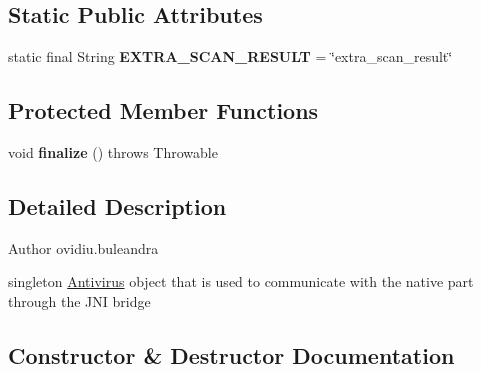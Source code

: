 \subsection*{Static Public Attributes}
\begin{DoxyCompactItemize}
\item 
\hypertarget{classcom_1_1avira_1_1antivirusimplementation_1_1_antivirus_afb5b02cd80b91515905739e16d261c26}{}static final String {\bfseries E\+X\+T\+R\+A\+\_\+\+S\+C\+A\+N\+\_\+\+R\+E\+S\+U\+L\+T} = \char`\"{}extra\+\_\+scan\+\_\+result\char`\"{}\label{classcom_1_1avira_1_1antivirusimplementation_1_1_antivirus_afb5b02cd80b91515905739e16d261c26}

\end{DoxyCompactItemize}
\subsection*{Protected Member Functions}
\begin{DoxyCompactItemize}
\item 
\hypertarget{classcom_1_1avira_1_1antivirusimplementation_1_1_antivirus_a1e81ca54b1eabb5cc5f8b695da05b54c}{}void {\bfseries finalize} ()  throws Throwable \label{classcom_1_1avira_1_1antivirusimplementation_1_1_antivirus_a1e81ca54b1eabb5cc5f8b695da05b54c}

\end{DoxyCompactItemize}


\subsection{Detailed Description}
\begin{DoxyAuthor}{Author}
ovidiu.\+buleandra
\end{DoxyAuthor}
singleton \hyperlink{classcom_1_1avira_1_1antivirusimplementation_1_1_antivirus}{Antivirus} object that is used to communicate with the native part through the J\+N\+I bridge 

\subsection{Constructor \& Destructor Documentation}
\hypertarget{classcom_1_1avira_1_1antivirusimplementation_1_1_antivirus_a01065f9ba50e068c7741f15fbb622e8b}{}
